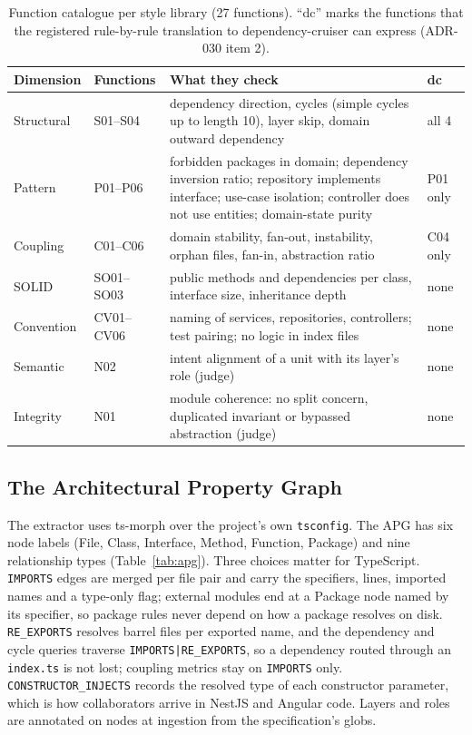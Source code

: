 \documentclass[10pt,a4paper]{article}
\newcommand{\dc}{dependency-cruiser}
\newcommand{\edge}[1]{\texttt{\small #1}}
\begin{document}
\begin{table}[t]
\centering
\caption{Function catalogue per style library (27 functions). ``dc'' marks the functions that the registered
rule-by-rule translation to \dc{} can express (ADR-030 item 2).}
\label{tab:catalogue}
\small
\begin{tabularx}{\linewidth}{@{}l l X l@{}}
\toprule
Dimension & Functions & What they check & dc \\
\midrule
Structural & S01--S04 & dependency direction, cycles (simple cycles up to length 10), layer skip, domain outward dependency & all 4 \\
Pattern & P01--P06 & forbidden packages in domain; dependency inversion ratio; repository implements interface; use-case isolation; controller does not use entities; domain-state purity & P01 only \\
Coupling & C01--C06 & domain stability, fan-out, instability, orphan files, fan-in, abstraction ratio & C04 only \\
SOLID & SO01--SO03 & public methods and dependencies per class, interface size, inheritance depth & none \\
Convention & CV01--CV06 & naming of services, repositories, controllers; test pairing; no logic in index files & none \\
Semantic & N02 & intent alignment of a unit with its layer's role (judge) & none \\
Integrity & N01 & module coherence: no split concern, duplicated invariant or bypassed abstraction (judge) & none \\
\bottomrule
\end{tabularx}
\end{table}

\subsection{The Architectural Property Graph}\label{sec:apg}

The extractor uses ts-morph over the project's own \texttt{tsconfig}. The APG has six node labels (File, Class,
Interface, Method, Function, Package) and nine relationship types (Table~\ref{tab:apg}).
Three choices matter for TypeScript. \edge{IMPORTS} edges are merged per file pair and carry the specifiers, lines,
imported names and a type-only flag; external modules end at a Package node named by its specifier, so package rules
never depend on how a package resolves on disk. \edge{RE\_EXPORTS} resolves barrel files per exported name, and the
dependency and cycle queries traverse \edge{IMPORTS|RE\_EXPORTS}, so a dependency routed through an
\texttt{index.ts} is not lost; coupling metrics stay on \edge{IMPORTS} only. \edge{CONSTRUCTOR\_INJECTS} records
the resolved type of each constructor parameter, which is how collaborators arrive in NestJS and Angular code.
Layers and roles are annotated on nodes at ingestion from the specification's globs.
\end{document}
